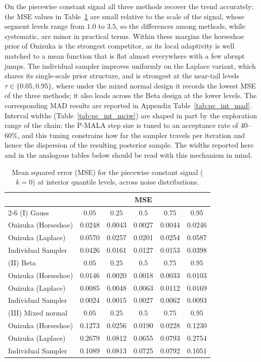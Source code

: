 On the piecewise constant signal all three methods recover the trend accurately: the MSE values in Table~\ref{tab:pc_int_mse} are small relative to the scale of the signal, whose segment levels range from $1.0$ to $3.5$, so the differences among methods, while systematic, are minor in practical terms. Within these margins the horseshoe prior of Onizuka is the strongest competitor, as its local adaptivity is well matched to a mean function that is flat almost everywhere with a few abrupt jumps. The individual sampler improves uniformly on the Laplace variant, which shares its single-scale prior structure, and is strongest at the near-tail levels $\tau \in \{0.05, 0.95\}$, where under the mixed normal design it records the lowest MSE of the three methods; it also leads across the Beta design at the lower levels. The corresponding MAD results are reported in Appendix Table~\ref{tab:pc_int_mad}. Interval widths (Table~\ref{tab:pc_int_mciw}) are shaped in part by the exploration range of the chain: the P-MALA step size is tuned to an acceptance rate of 40--60\%, and this tuning constrains how far the sampler travels per iteration and hence the dispersion of the resulting posterior sample. The widths reported here and in the analogous tables below should be read with this mechanism in mind.

\begin{table}[htbp]
\centering
\caption{Mean squared error (MSE) for the piecewise constant signal ($k=0$) at interior quantile levels, across noise distributions.}
\label{tab:pc_int_mse}
\begin{tabular}{lccccc}
\toprule
& \multicolumn{5}{c}{MSE} \\
\cmidrule(lr){2-6}
(I) Gauss & $0.05$ & $0.25$ & $0.5$ & $0.75$ & $0.95$ \\
\midrule
Onizuka (Horseshoe) & 0.0248 & 0.0043 & 0.0027 & 0.0044 & 0.0246 \\
Onizuka (Laplace)   & 0.0570 & 0.0257 & 0.0201 & 0.0254 & 0.0587 \\
Individual Sampler  & 0.0426 & 0.0161 & 0.0127 & 0.0153 & 0.0398 \\
\midrule
(II) Beta & $0.05$ & $0.25$ & $0.5$ & $0.75$ & $0.95$ \\
\midrule
Onizuka (Horseshoe) & 0.0146 & 0.0020 & 0.0018 & 0.0033 & 0.0103 \\
Onizuka (Laplace)   & 0.0085 & 0.0048 & 0.0063 & 0.0112 & 0.0169 \\
Individual Sampler  & 0.0024 & 0.0015 & 0.0027 & 0.0062 & 0.0093 \\
\midrule
(III) Mixed normal & $0.05$ & $0.25$ & $0.5$ & $0.75$ & $0.95$ \\
\midrule
Onizuka (Horseshoe) & 0.1273 & 0.0256 & 0.0190 & 0.0228 & 0.1230 \\
Onizuka (Laplace)   & 0.2679 & 0.0812 & 0.0655 & 0.0793 & 0.2754 \\
Individual Sampler  & 0.1089 & 0.0813 & 0.0725 & 0.0792 & 0.1051 \\
\bottomrule
\end{tabular}
\end{table}

